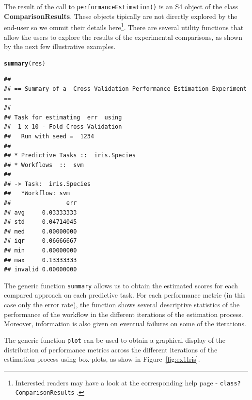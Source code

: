 \documentclass[10pt,a4paper]{article}\usepackage[]{graphicx}\usepackage[]{color}
\makeatletter
\newcommand{\hlstd}[1]{\textcolor[rgb]{0.345,0.345,0.345}{#1}}%
\newcommand{\hlkwd}[1]{\textcolor[rgb]{0.737,0.353,0.396}{\textbf{#1}}}%
\newenvironment{kframe}{%
 \def\at@end@of@kframe{}%
 \ifinner\ifhmode%
  \def\at@end@of@kframe{\end{minipage}}%
  \begin{minipage}{\columnwidth}%
 \fi\fi%
 \def\FrameCommand##1{\hskip\@totalleftmargin \hskip-\fboxsep
 \colorbox{shadecolor}{##1}\hskip-\fboxsep
     \hskip-\linewidth \hskip-\@totalleftmargin \hskip\columnwidth}%
 \MakeFramed {\advance\hsize-\width
   \@totalleftmargin\z@ \linewidth\hsize
   \@setminipage}}%
 {\par\unskip\endMakeFramed%
 \at@end@of@kframe}
\newenvironment{knitrout}{}{} %
\makeatother
\begin{document}
The result of the call to \texttt{performanceEstimation()} is an S4
object of the class \textbf{ComparisonResults}. These objects tipically are not
 directly explored by the end-user so we ommit their
details here\footnote{Interested readers may have a look at the corresponding
  help page - \texttt{class?ComparisonResults} .}. There are several utility
functions that allow the users to explore the results of the
experimental comparisons, as shown by the next few illustrative examples.




\begin{knitrout}\footnotesize
{}\color{fgcolor}\begin{kframe}
\begin{alltt}
\hlkwd{summary}\hlstd{(res)}
\end{alltt}
\begin{verbatim}
## 
## == Summary of a  Cross Validation Performance Estimation Experiment ==
## 
## Task for estimating  err  using
##  1 x 10 - Fold Cross Validation
## 	 Run with seed =  1234 
## 
## * Predictive Tasks ::  iris.Species
## * Workflows  ::  svm 
## 
## -> Task:  iris.Species
##   *Workflow: svm 
##                err
## avg     0.03333333
## std     0.04714045
## med     0.00000000
## iqr     0.06666667
## min     0.00000000
## max     0.13333333
## invalid 0.00000000
\end{verbatim}
\end{kframe}
\end{knitrout}

The generic function \texttt{summary} allows us to obtain the
estimated scores for each compared approach on each predictive
task. For each performance metric (in this case only the error rate),
the function shows several descriptive statistics of the performance of the workflow in the different iterations of the estimation process. Moreover,
information is also given on eventual failures on some of the
iterations.



The generic function \texttt{plot} can be used to obtain a graphical
display of the distribution of performance metrics across the
different iterations of the estimation process using box-plots, as
show in Figure~\ref{fig:ex1Iris}. 
\end{document}
